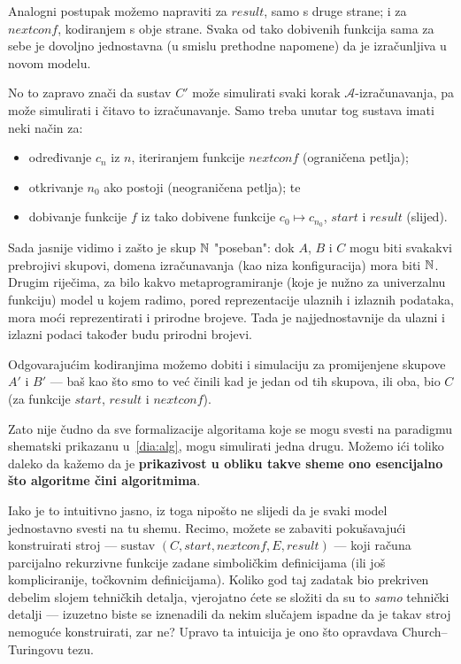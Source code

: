 Analogni postupak možemo napraviti za $result$, samo s druge strane; i za $nextconf$, kodiranjem s obje strane. Svaka od tako dobivenih funkcija sama za sebe je dovoljno jednostavna (u smislu prethodne napomene) da je iz\-ra\-čun\-lji\-va u novom modelu.

No to zapravo znači da sustav $C'$ može simulirati svaki korak $\mathcal A$-izračunavanja, pa može simulirati i čitavo to izračunavanje. Samo treba unutar tog sustava imati neki način za:
\begin{itemize}
    \item određivanje $c_n$ iz $n$, iteriranjem funkcije $nextconf$ (ograničena petlja);
    \item otkrivanje $n_0$ ako postoji (neograničena petlja); te
    \item dobivanje funkcije $f$ iz tako dobivene funkcije $c_0\mapsto c_{n_0}$, $start$ i $result$ (slijed).
\end{itemize}

Sada jasnije vidimo i zašto je skup ${\mathbb N}$ "poseban": dok $A$, $B$ i $C$ mogu biti svakakvi prebrojivi skupovi, domena izračunavanja (kao niza konfiguracija) mora biti ${\mathbb N}$. Drugim riječima, za bilo kakvo metaprogramiranje (koje je nužno za univerzalnu funkciju) model u kojem radimo, pored reprezentacije ulaznih i izlaznih podataka, mora moći reprezentirati i prirodne brojeve. Tada je najjednostavnije da ulazni i izlazni podaci također budu prirodni brojevi.

Odgovarajućim kodiranjima možemo dobiti i simulaciju za promijenjene skupove $A'$ i $B'$ --- baš kao što smo to već činili kad je jedan od tih skupova, ili oba, bio $C$ (za funkcije $start$, $result$ i $nextconf$).

Zato nije čudno da sve formalizacije algoritama koje se mogu svesti na paradigmu shematski prikazanu u~\eqref{dia:alg}, mogu simulirati jedna drugu. Možemo ići toliko daleko da kažemo da je \textbf{prikazivost u obliku takve sheme ono esencijalno što algoritme čini algoritmima}.

Iako je to intuitivno jasno, iz toga nipošto ne slijedi da je svaki model jednostavno svesti na tu shemu. Recimo, možete se zabaviti pokušavajući konstruirati stroj --- sustav $(C,start,nextconf,E,result)$ --- koji računa parcijalno rekurzivne funkcije zadane simboličkim definicijama (ili još kompliciranije, točkovnim definicijama). Koliko god taj zadatak bio prekriven debelim slojem tehničkih detalja, vjerojatno ćete se složiti da su to \emph{samo} tehnički detalji --- izuzetno biste se iznenadili da nekim slučajem ispadne da je takav stroj nemoguće konstruirati, zar ne? Upravo ta intuicija je ono što opravdava Church--\!Turingovu tezu.

